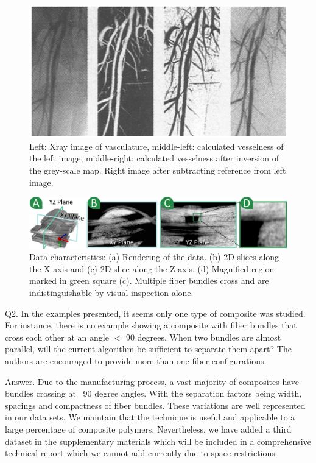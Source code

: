 \documentclass[]{article}
\begin{document}
\begin{figure}
\centering
\includegraphics[width=0.7\linewidth]{images_pvis/Vesselness}
\caption{Left: Xray image of vasculature, middle-left: calculated vesselness of the left image, middle-right: calculated vesselness after inversion of the grey-scale map. Right image after subtracting reference from left image.}
\label{fig:Vesselness}
\end{figure}

\begin{figure}[tb]
	\centering
	\includegraphics[width=\linewidth]{images_pvis/data-char.pdf}
	\caption{Data characteristics: (a) Rendering of the data. (b) 2D slices along the X-axis and (c) 2D slice along the Z-axis. (d) Magnified region marked in green square (c). Multiple fiber bundles cross and are indistinguishable by visual inspection alone. }
	\label{fig:data-char-rebuttal}
\end{figure}

\color{red}
Q2. In the examples presented, it seems only one type of composite was studied. For instance, there is no example showing a composite with fiber bundles that cross each other at an angle $<$ 90 degrees. When two bundles are almost parallel, will the current algorithm be sufficient to separate them apart? The authors are encouraged to provide more than one fiber configurations.
\color{black}

Answer. Due to the manufacturing process, a vast majority of composites have bundles crossing at ~90 degree angles. With the separation factors being width, spacings and compactness of fiber bundles. These variations are well represented in our data sets. We maintain that the technique is useful and applicable to a large percentage of composite polymers. Nevertheless, we have added a third dataset in the supplementary materials which will be included in a comprehensive technical report which we cannot add currently due to space restrictions.
\end{document}
